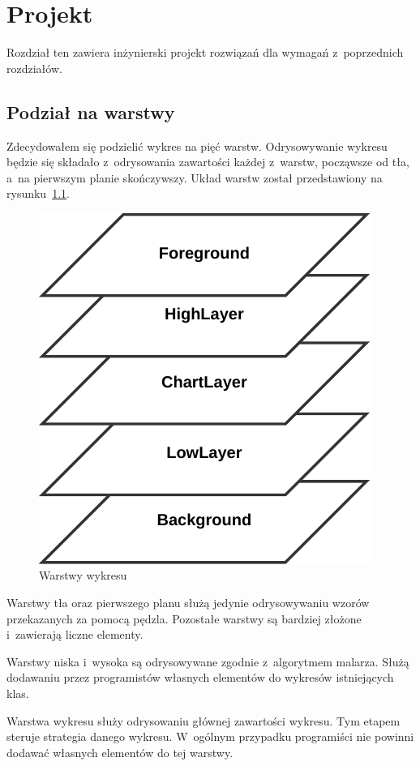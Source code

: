 \chapter{Projekt}
Rozdział ten zawiera inżynierski projekt rozwiązań dla wymagań z~poprzednich rozdziałów.

\section{Podział na warstwy}
Zdecydowałem się podzielić wykres na pięć warstw. Odrysowywanie wykresu będzie się składało z~odrysowania zawartości każdej z~warstw, począwsze od tła, a~na pierwszym planie skończywszy.
Układ warstw został przedstawiony na rysunku~\ref{rys:warstwy}.

\begin{figure}[H]
\centering
\includegraphics{img/warstwy.pdf}
\caption{Warstwy wykresu}\label{rys:warstwy}
\end{figure}

Warstwy tła oraz pierwszego planu służą jedynie odrysowywaniu wzorów przekazanych za pomocą pędzla. Pozostałe warstwy są bardziej złożone i~zawierają liczne elementy.

Warstwy niska i~wysoka są odrysowywane zgodnie z~algorytmem malarza. Służą dodawaniu przez programistów własnych elementów do wykresów istniejących klas.

Warstwa wykresu służy odrysowaniu głównej zawartości wykresu. Tym etapem steruje strategia danego wykresu. W~ogólnym przypadku programiści nie powinni dodawać własnych elementów do tej warstwy.

